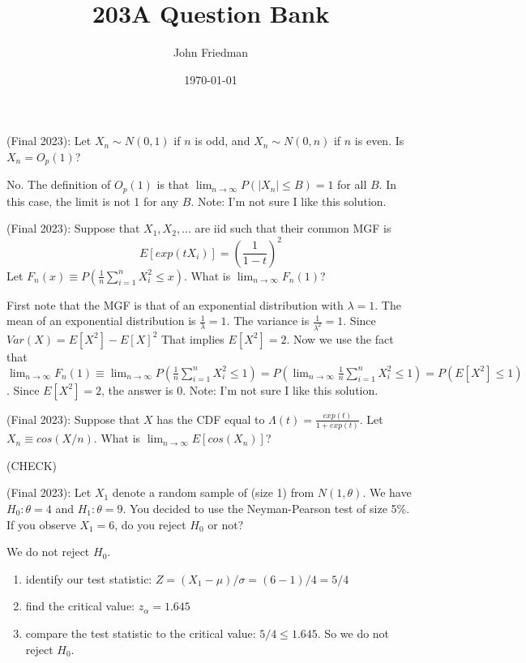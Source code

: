 \documentclass[answers]{exam}
\title{203A Question Bank}
\author{John Friedman}
\date{\today}
\begin{document}
\maketitle

\begin{questions}

\question (Final 2023): Let $X_n \sim N(0,1)$ if $n$ is odd, and $X_n \sim N(0,n)$ if $n$ is even. Is $X_n = O_p(1)$?
\begin{solution}
    No. The definition of $O_p(1)$ is that $\lim_{n \to \infty} P(|X_n| \leq B) = 1$ for all $B$. In this case, the limit is not 1 for any $B$.
    Note: I'm not sure I like this solution.
\end{solution}

\question (Final 2023): Suppose that $X_1,X_2,...$ are iid such that their common MGF is 
$$E[exp(t X_i)] = (\frac{1}{1-t})^2$$
Let $F_n(x) \equiv P(\frac{1}{n} \sum_{i=1}^n X_i^2 \leq x)$. What is $\lim_{n \to \infty} F_n(1)$?
\begin{solution}
    First note that the MGF is that of an exponential distribution with $\lambda = 1$. The mean of an exponential distribution is $\frac{1}{\lambda} = 1$. The variance is $\frac{1}{\lambda^2} = 1$. Since $Var(X) = E[X^2] - E[X]^2$ That implies $E[X^2] = 2$. Now we use the fact that 
    $\lim_{n \to \infty} F_n(1) \equiv \lim_{n \to \infty}  P(\frac{1}{n} \sum_{i=1}^n X_i^2 \leq 1) = P(\lim_{n \to \infty} \frac{1}{n} \sum_{i=1}^n X_i^2 \leq 1) = P(E[X^2] \leq 1)$. Since $E[X^2] = 2$, the answer is 0.
    Note: I'm not sure I like this solution.
    \end{solution}

\question (Final 2023): Suppose that $X$ has the CDF equal to $\Lambda(t) = \frac{exp(t)}{1+exp(t)}$. Let $X_n \equiv cos(X/n)$. What is $\lim_{n \to \infty} E[cos(X_n)]$?
\begin{solution}
    (CHECK)
\end{solution}

\question (Final 2023): Let $X_1$ denote a random sample of (size 1) from $N(1,\theta)$. We have $H_0 : \theta = 4$ and $H_1 : \theta = 9$. You decided to use the Neyman-Pearson test of size 5\%. If you observe $X_1=6$, do you reject $H_0$ or not?
\begin{solution}
    We do not reject $H_0$.
    \begin{enumerate}
        \item  identify our test statistic: $ Z = (X_1 - \mu)/\sigma = (6-1)/4 = 5/4$
        \item  find the critical value: $z_{\alpha} = 1.645$
        \item  compare the test statistic to the critical value: $5/4 \le 1.645$. So we do not reject $H_0$.
    \end{enumerate}


\end{solution}
\end{questions}
\end{document}
